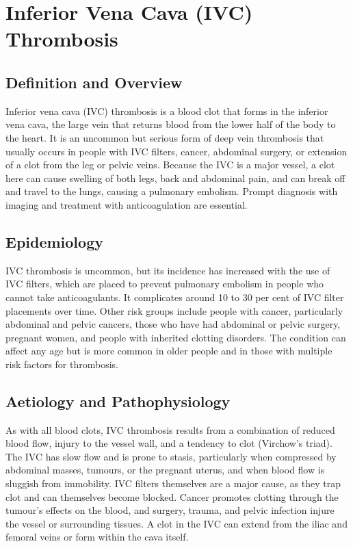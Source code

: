 \chapter{Inferior Vena Cava (IVC) Thrombosis}

\section*{Definition and Overview}
Inferior vena cava (IVC) thrombosis is a blood clot that forms in the inferior vena cava, the large vein that returns blood from the lower half of the body to the heart. It is an uncommon but serious form of deep vein thrombosis that usually occurs in people with IVC filters, cancer, abdominal surgery, or extension of a clot from the leg or pelvic veins. Because the IVC is a major vessel, a clot here can cause swelling of both legs, back and abdominal pain, and can break off and travel to the lungs, causing a pulmonary embolism. Prompt diagnosis with imaging and treatment with anticoagulation are essential.

\section*{Epidemiology}
IVC thrombosis is uncommon, but its incidence has increased with the use of IVC filters, which are placed to prevent pulmonary embolism in people who cannot take anticoagulants. It complicates around 10 to 30 per cent of IVC filter placements over time. Other risk groups include people with cancer, particularly abdominal and pelvic cancers, those who have had abdominal or pelvic surgery, pregnant women, and people with inherited clotting disorders. The condition can affect any age but is more common in older people and in those with multiple risk factors for thrombosis.

\section*{Aetiology and Pathophysiology}
As with all blood clots, IVC thrombosis results from a combination of reduced blood flow, injury to the vessel wall, and a tendency to clot (Virchow's triad). The IVC has slow flow and is prone to stasis, particularly when compressed by abdominal masses, tumours, or the pregnant uterus, and when blood flow is sluggish from immobility. IVC filters themselves are a major cause, as they trap clot and can themselves become blocked. Cancer promotes clotting through the tumour's effects on the blood, and surgery, trauma, and pelvic infection injure the vessel or surrounding tissues. A clot in the IVC can extend from the iliac and femoral veins or form within the cava itself.

